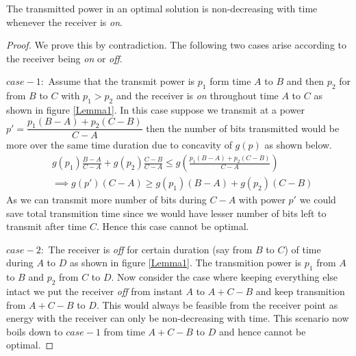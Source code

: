 \begin{lemma}
The transmitted power in an optimal solution is non-decreasing with time whenever the receiver is \textit{on}.
\label{increasing_power}
\end{lemma}
\begin{proof}
We prove this by contradiction. The following two cases arise according to the receiver being \textit{on} or \textit{off}.

$case-1:$ Assume that the transmit power is $p_1$ form time $A$ to $B$ and then $p_2$ for from $B$ to $C$ with $p_1>p_2$ and the receiver is \textit{on} throughout time $A$ to $C$ as shown in figure \ref{Lemma1}. In this case suppose we transmit at a power $p'=\dfrac{p_1(B-A)+p_2(C-B)}{C-A}$ then the number of bits transmitted would be more over the same time duration due to concavity of $g(p)$ as shown below.
\begin{align}
&g(p_1)\frac{B-A}{C-A}+g(p_2)\frac{C-B}{C-A} \le g(\frac{p_1(B-A)+p_2(C-B)}{C-A})
\\
&\implies g(p')(C-A)\ge g(p_1)(B-A)+g(p_2)(C-B)  
\end{align}
As we can transmit more number of bits during $C-A$ with power $p'$ we could save total transmition time since we would have lesser number of bits left to transmit after time $C$. Hence this case cannot be optimal.

$case-2:$ The receiver is \textit{off} for certain duration (say from $B$ to $C$) of time during $A$ to $D$ as shown in figure \ref{Lemma1}. The transmition power is $p_1$ from $A$ to $B$ and $p_2$ from $C$ to $D$. Now consider the case where keeping everything else intact we put the receiver \textit{off} from instant $A$ to $A+C-B$ and keep transmition from $A+C-B$ to $D$. This would always be feasible from the receiver point as energy with the receiver can only be non-decreasing with time. This scenario now boils down to $case-1$ from time $A+C-B$ to $D$ and hence cannot be optimal.
\end{proof}

